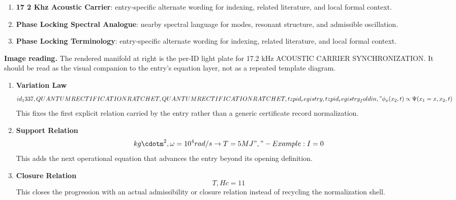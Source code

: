 \begin{enumerate}[leftmargin=1.6em,itemsep=6pt,topsep=4pt]
\item \textbf{17 2 Khz Acoustic Carrier}: entry-specific alternate wording for indexing, related literature, and local formal context.
\item \textbf{Phase Locking Spectral Analogue}: nearby spectral language for modes, resonant structure, and admissible oscillation.
\item \textbf{Phase Locking Terminology}: entry-specific alternate wording for indexing, related literature, and local formal context.
\end{enumerate}

\begin{samepage}
\noindent\begin{minipage}[t]{0.45\linewidth}
\vspace{0pt}
\raggedright
\scriptsize\textbf{Image reading.} The rendered manifold at right is the per-ID light plate for 17.2 kHz ACOUSTIC CARRIER SYNCHRONIZATION. It should be read as the visual companion to the entry's equation layer, not as a repeated template diagram.\par
\end{minipage}\hfill
\begin{minipage}[t]{0.53\linewidth}
\vspace*{-0.10in}
\raggedright
{}
\end{minipage}
\end{samepage}

\clearpage


\begin{enumerate}[leftmargin=1.6em,itemsep=9pt,topsep=6pt]
\item \textbf{Variation Law}
\[
id_1337,QUANTUM RECTIFICATION RATCHET,QUANTUM RECTIFICATION RATCHET,tzpid_registry,tzpid_registry_foldin,"\phi_x(x_2,t) \propto \Psi(x_1=x,x_2,t)
\]
This fixes the first explicit relation carried by the entry rather than a generic certificate record normalization.

\item \textbf{Support Relation}
\[
kg\cdotm^2, \omega = 10^4 rad/s \to T = 5 MJ","- Example: I = 0
\]
This adds the next operational equation that advances the entry beyond its opening definition.

\item \textbf{Closure Relation}
\[
T, Hc = 11
\]
This closes the progression with an actual admissibility or closure relation instead of recycling the normalization shell.
\end{enumerate}

